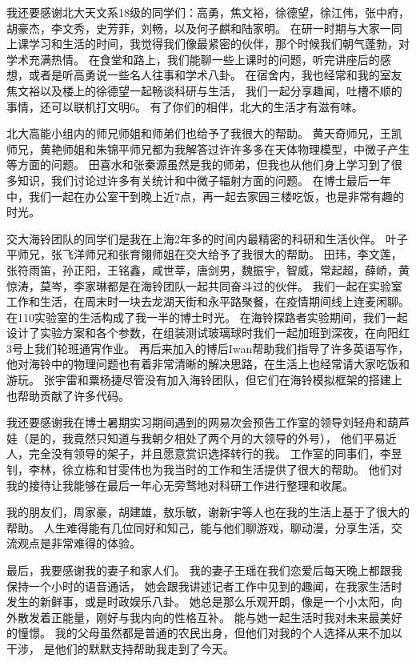我还要感谢北大天文系18级的同学们：高勇，焦文裕，徐德望，徐江伟，张中府，胡豪杰，李文秀，史芳菲，刘畅，以及何子麒和陆家明。
在研一时期与大家一同上课学习和生活的时间，我觉得我们像最紧密的伙伴，那个时候我们朝气蓬勃，对学术充满热情。
在食堂和路上，我们能聊一些上课时的问题，听完讲座后的感想，或者是听高勇说一些名人往事和学术八卦。
在宿舍内，我也经常和我的室友焦文裕以及楼上的徐德望一起畅谈科研与生活，
我们一起分享趣闻，吐槽不顺的事情，还可以联机打文明6。
有了你们的相伴，北大的生活才有滋有味。

北大高能小组内的师兄师姐和师弟们也给予了我很大的帮助。
黄天奇师兄，王凯师兄，黄艳师姐和朱锦平师兄都为我解答过许许多多在天体物理模型，中微子产生等方面的问题。
田喜水和张秦源虽然是我的师弟，但我也从他们身上学习到了很多知识，我们讨论过许多有关统计和中微子辐射方面的问题。
在博士最后一年中，我们一起在办公室干到晚上近7点，再一起去家园三楼吃饭，也是非常有趣的时光。

交大海铃团队的同学们是我在上海2年多的时间内最精密的科研和生活伙伴。
叶子平师兄，张飞洋师兄和张育翎师姐在交大给予了我很大的帮助。
田玮，李文莲，张符雨笛，孙正阳，王铭鑫，咸世莘，唐剑男，魏振宇，智威，常起超，薛峤，黄惊涛，莫岑，李家琳都是在海铃团队一起共同奋斗过的伙伴。
我们一起在实验室工作和生活，在周末时一块去龙湖天街和永平路聚餐，在疫情期间线上连麦闲聊。
在110实验室的生活构成了我一半的博士时光。
在海铃探路者实验期间，我们一起设计了实验方案和各个参数，在组装测试玻璃球时我们一起加班到深夜，在向阳红3号上我们轮班通宵作业。
再后来加入的博后Iwan帮助我们指导了许多英语写作，他对海铃中的物理问题也有着非常清晰的解决思路，在生活上也经常请大家吃饭和游玩。
张宇雷和粟杨捷尽管没有加入海铃团队，但它们在海铃模拟框架的搭建上也帮助贡献了许多代码。

我还要感谢我在博士暑期实习期间遇到的网易次会预告工作室的领导刘轻舟和葫芦娃（是的，我竟然只知道与我朝夕相处了两个月的大领导的外号），
他们平易近人，完全没有领导的架子，并且愿意赏识选择转行的我。
工作室的同事们，李昱钊，李林，徐立栋和甘雯伟也为我当时的工作和生活提供了很大的帮助。
他们对我的接待让我能够在最后一年心无旁骛地对科研工作进行整理和收尾。

我的朋友们，周家豪，胡建雄，敖乐敏，谢新宇等人也在我的生活上基于了很大的帮助。
人生难得能有几位同好和知己，能与他们聊游戏，聊动漫，分享生活，交流观点是非常难得的体验。


最后，我要感谢我的妻子和家人们。
我的妻子王瑶在我们恋爱后每天晚上都跟我保持一个小时的语音通话，
她会跟我讲述记者工作中见到的趣闻，在我家生活时发生的新鲜事，或是时政娱乐八卦。
她总是那么乐观开朗，像是一个小太阳，向外散发着正能量，刚好与我内向的性格互补。
能与她一起生活时我对未来最美好的憧憬。
我的父母虽然都是普通的农民出身，但他们对我的个人选择从来不加以干涉，
是他们的默默支持帮助我走到了今天。
